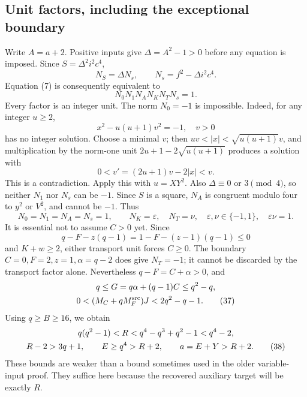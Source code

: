 \documentclass[11pt,a4paper]{article}
\theoremstyle{definition}
\theoremstyle{remark}
\begin{document}
\subsection{Unit factors, including the exceptional boundary}
Write \(A=a+2\). Positive inputs give
\(\Delta=A^2-1>0\) before any equation is imposed.
Since \(S=\Delta^2i^2c^4\),
\[
 N_S=\Delta N_s,\qquad N_s=f^2-\Delta i^2c^4. \tag{31}
\]
Equation (7) is consequently equivalent to
\[
 N_0N_1N_AN_KN_TN_s=1. \tag{32}\label{eq:unitprod}
\]
Every factor is an integer unit.
The norm \(N_0=-1\) is impossible. Indeed, for any integer \(u\ge2\),
\[
 x^2-u(u+1)v^2=-1,\quad v>0 \tag{33}
\]
has no integer solution. Choose a minimal \(v\); then
\(uv<|x|<\sqrt{u(u+1)}v\), and multiplication by the norm-one
unit \(2u+1-2\sqrt{u(u+1)}\) produces a solution with
\[
 0<v'=(2u+1)v-2|x|<v. \tag{34}
\]
This is a contradiction. Apply this with \(u=XY^2\).
Also \(\Delta\equiv0\) or \(3\pmod4\), so neither \(N_1\) nor \(N_s\)
can be \(-1\). Since \(S\) is a square, \(N_A\) is congruent modulo
four to \(y^2\) or \(V^2\), and cannot be \(-1\). Thus
\[
 N_0=N_1=N_A=N_s=1,\qquad
 N_K=\varepsilon,\quad N_T=\nu,\quad
 \varepsilon,\nu\in\{-1,1\},\quad\varepsilon\nu=1. \tag{35}
\]
It is essential not to assume \(C>0\) yet. Since
\[
 q-F-z(q-1)=1-F-(z-1)(q-1)\le0 \tag{36}
\]
and \(K+w\ge2\), either transport unit forces \(C\ge0\).
The boundary \(C=0,F=2,z=1,\alpha=q-2\) does give \(N_T=-1\);
it cannot be discarded by the transport factor alone.
Nevertheless \(q-F=C+\alpha>0\), and
\begin{gather}
 q\le G=q\alpha+(q-1)C\le q^2-q,\notag\\
 0<(M_C+qM_F^{\rm src})J<2q^2-q-1. \tag{37}
\end{gather}
Using \(q\ge B\ge16\), we obtain
\begin{gather}
 q(q^2-1)<R<q^4-q^3+q^2-1<q^4-2,\notag\\
 R-2>3q+1,\qquad E\ge q^4>R+2,\qquad a=E+Y>R+2. \tag{38}\label{eq:weakbounds}
\end{gather}
These bounds are weaker than a bound sometimes used in the older
variable-input proof. They suffice here because the recovered auxiliary
target will be exactly \(R\).
\end{document}
